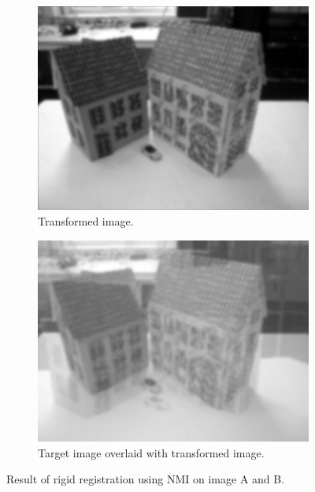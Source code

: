 \begin{figure}[h]
	\centering
	\begin{subfigure}{0.4\linewidth}
		\centering
		\includegraphics[width=\linewidth]{Materials/rigidNMIAB}
		\caption{Transformed image.\newline}
	\end{subfigure}
	\hspace{1cm}
	\begin{subfigure}{0.4\linewidth}
		\centering
		\includegraphics[width=\linewidth]{Materials/rigidNMIABO}
		\caption{Target image overlaid with transformed image.}
	\end{subfigure}
	\caption{Result of rigid registration using NMI on image A and B.}
	\label{rigidNMIAB}
\end{figure}
